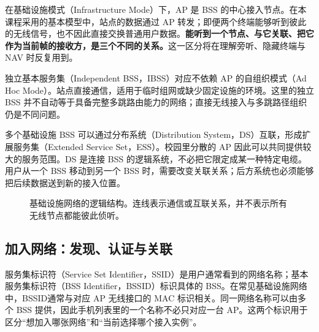 在基础设施模式（Infrastructure Mode）下，AP 是 BSS 的中心接入节点。在本课程采用的基本模型中，站点的数据通过 AP 转发；即便两个终端能够听到彼此的无线信号，也不因此直接交换普通用户数据。\textbf{能听到一个节点、与它关联、把它作为当前帧的接收方，是三个不同的关系。}这一区分将在理解旁听、隐藏终端与 NAV 时反复用到。

独立基本服务集（Independent BSS，IBSS）对应不依赖 AP 的自组织模式（Ad Hoc Mode）。站点直接通信，适用于临时组网或缺少固定设施的环境。这里的独立 BSS 并不自动等于具备完整多跳路由能力的网络；直接无线接入与多跳路径组织仍是不同问题。

多个基础设施 BSS 可以通过分布系统（Distribution System，DS）互联，形成扩展服务集（Extended Service Set，ESS）。校园里分散的 AP 因此可以共同提供较大的服务范围。DS 是连接 BSS 的逻辑系统，不必把它限定成某一种特定电缆。用户从一个 BSS 移动到另一个 BSS 时，需要改变关联关系；后方系统也必须能够把后续数据送到新的接入位置。

\begin{figure}[htbp]
\centering
{}
\caption{基础设施网络的逻辑结构。连线表示通信或互联关系，并不表示所有无线节点都能彼此侦听。}
\label{fig:wifi-ess}
\end{figure}

\subsection{加入网络：发现、认证与关联}

服务集标识符（Service Set Identifier，SSID）是用户通常看到的网络名称；基本服务集标识符（BSS Identifier，BSSID）标识具体的 BSS。在常见基础设施网络中，BSSID通常与对应 AP 无线接口的 MAC 标识相关。同一网络名称可以由多个 BSS 提供，因此手机列表里的一个名称不必只对应一台 AP。这两个标识用于区分“想加入哪张网络”和“当前选择哪个接入实例”。

